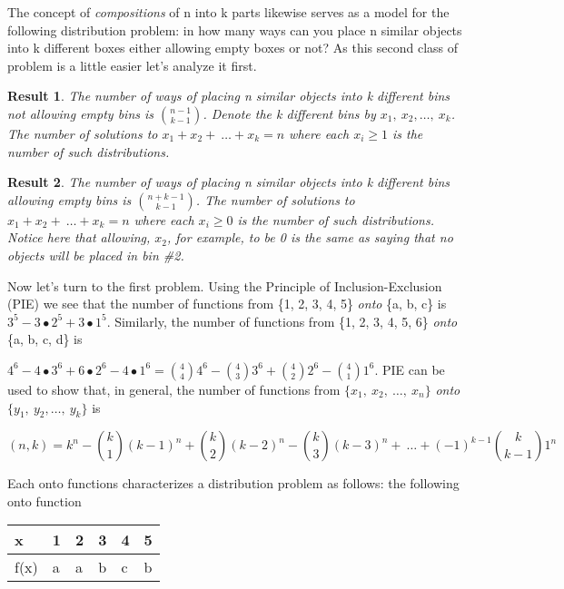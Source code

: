 \documentclass[10pt,letter]{article}
\newtheorem{result}{Result}[section]
\begin{document}
The concept of \emph{compositions} of n into k parts likewise serves as
a model for the following distribution problem: in how many ways can you
place n similar objects into k different boxes either allowing empty
boxes or not? As this second class of problem is a little easier let's
analyze it first.

\begin{result}The number of ways of placing n similar objects into k different
bins not allowing empty bins is \(\binom{n - 1}{k - 1}
\). Denote the k different bins by
\(x_{1},\ x_{2},\ldots,\ x_{k}\). The number of solutions to
\(x_{1} + x_{2} + \ \ldots + x_{k} = n\) where each \(x_{i} \geq 1\) is
the number of such distributions.
\end{result}

\begin{result}  The number of ways of placing n similar objects into k different
  bins allowing empty bins is \(\binom{n + k - 1}{k - 1}
  \). The number of solutions to
  \(x_{1} + x_{2} + \ \ldots + x_{k} = n\) where each \(x_{i} \geq 0\) is
  the number of such distributions. Notice here that allowing, \(x_{2}\),
  for example, to be 0 is the same as saying that no objects will be
  placed in bin \#2.
\end{result}

Now let's turn to the first problem. Using the Principle of
Inclusion-Exclusion (PIE) we see that the number of functions from \{1,
2, 3, 4, 5\} \emph{onto} \{a, b, c\} is
\(3^{5} - 3 \bullet 2^{5} + 3 \bullet 1^{5}\). Similarly, the number of
functions from \{1, 2, 3, 4, 5, 6\} \emph{onto} \{a, b, c, d\} is

\(4^{6} - 4 \bullet 3^{6} + 6 \bullet 2^{6} - 4 \bullet 1^{6} =
\binom{4}{4}
4^{6} -
\binom{4}{3}
3^{6} +
\binom{4}{2}
2^{6} -
\binom{4}{1}
1^{6}.\) PIE can be used to show that, in general, the
number of functions from \(\{ x_{1},\ x_{2},\ \ldots,\ x_{n}\}\)
\emph{onto} \(\{ y_{1},\ y_{2},\ldots,\ y_{k}\}\) is

\[
\left( n,k \right) = k^{n} - \binom{k}{1} \left( k - 1 \right)^{n} + \binom{k}{2} \left( k - 2 \right)^{n} - \binom{k}{3} \left( k - 3 \right)^{n} + \ \ldots + \left( - 1 \right)^{k - 1}\binom{k}{k - 1} 1^{n}
\]

Each onto functions characterizes a distribution problem as follows: the
following onto function
\begin{longtable}[]{@{}llllll@{}}
\toprule
x & 1 & 2 & 3 & 4 & 5\tabularnewline
\midrule
\endhead
f(x) & a & a & b & c & b\tabularnewline
\bottomrule

\end{longtable}
\end{document}
